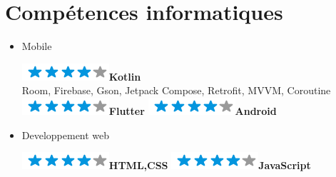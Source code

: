 \documentclass[]{friggeri-cv}
\begin{document}
\section{Compétences informatiques}
        \vspace*{-0.45cm}
        \setlength{\columnsep}{-0.3cm}
        \begin{flushleft}
        \begin{multicols}{3}
		\begin{itemize}
		
		\setlength{\itemsep}{5pt}
  		\setlength{\parskip}{0pt}
  		\setlength{\parsep}{0pt}
          
        
\item \large Mobile \
\normalsize
\begin{flushleft}

\includegraphics[scale=0.40]{res/img/4stars.png}\hspace{1.5mm}\textbf{Kotlin}\\Room, Firebase, Gson, Jetpack Compose, Retrofit, MVVM, Coroutine\\\vspace{2mm}
\includegraphics[scale=0.40]{res/img/4stars.png}\hspace{1.5mm}\textbf{Flutter}
\includegraphics[scale=0.40]{res/img/4stars.png}\hspace{1.5mm}\textbf{Android}
\end{flushleft}            

\item \large Developpement web \
\normalsize
\begin{flushleft}

\includegraphics[scale=0.40]{res/img/4stars.png}\hspace{1.5mm}\textbf{HTML,CSS}
\includegraphics[scale=0.40]{res/img/4stars.png}\hspace{1.5mm}\textbf{JavaScript}
\end{flushleft}            


\end{itemize}
\end{multicols}
\end{flushleft}
\end{document}
